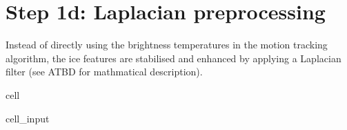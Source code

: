 \documentclass[letterpaper,10pt,english]{jupyterBook}
\begin{document}
\chapter{Step 1d: Laplacian pre\sphinxhyphen{}processing}
\label{\detokenize{CIMR_L2_Sea_Ice_Drift_algorithm:step-1d-laplacian-pre-processing}}
\sphinxAtStartPar
Instead of directly using the brightness temperatures in the motion tracking algorithm, the ice features are stabilised and enhanced by applying a Laplacian filter (see ATBD for mathmatical description).

\begin{sphinxuseclass}{cell}\begin{sphinxVerbatimInput}

\begin{sphinxuseclass}{cell_input}
\begin{sphinxVerbatim}[commandchars=\\\{\}]

   


 
      
     

 
     


\end{sphinxVerbatim}
\end{sphinxuseclass}
\end{sphinxVerbatimInput}
\end{sphinxuseclass}
\end{document}
